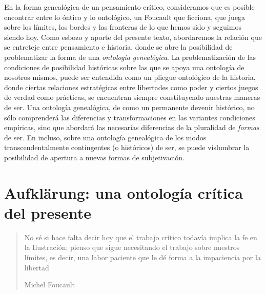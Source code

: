 En la forma genealógica de un pensamiento crítico, consideramos que es posible encontrar entre lo óntico y lo ontológico, un Foucault que ficciona, que juega sobre los límites, los bordes y las fronteras de lo que hemos sido y seguimos siendo hoy. Como esbozo y aporte del presente texto, abordaremos la relación que se entreteje entre pensamiento e historia, donde se abre la posibilidad de problematizar la forma de una \emph{ontología genealógica}. La problematización de las condiciones de posibilidad históricas sobre las que se apoya una ontología de nosotros mismos, puede ser entendida como un pliegue ontológico de la historia, donde ciertas relaciones estratégicas entre libertades como poder y ciertos juegos de verdad como prácticas, se encuentran siempre constituyendo nuestras maneras de ser. Una ontología genealógica, de como un permanente devenir histórico, no sólo comprenderá las diferencias y transformaciones en las variantes condiciones empíricas, sino que abordará las necesarias diferencias de la pluralidad de \emph{formas} de ser. En incluso, sobre una ontología genealógica de los modos transcendentalmente contingentes (o históricos) de ser, se puede vislumbrar la posibilidad de apertura a nuevas formas de subjetivación.

\section{Aufklärung: una ontología crítica del presente}

\begin{quote}
No sé si hace falta decir hoy que el trabajo crítico todavía implica la fe en la Ilustración; pienso que sigue necesitando el trabajo sobre nuestros límites, es decir, una labor paciente que le dé forma a la impaciencia por la libertad

Michel Foucault
\end{quote}

